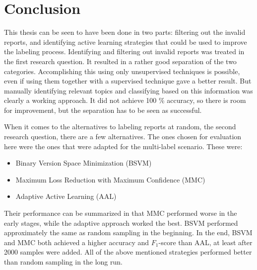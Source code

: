 
\chapter{Conclusion}
\label{cha:conclusion}

This thesis can be seen to have been done in two parts: filtering out the invalid reports, and identifying active learning strategies that could be used to improve the labeling process.
Identifying and filtering out invalid reports was treated in the first research question.
It resulted in a rather good separation of the two categories.
Accomplishing this using only unsupervised techniques is possible, even if using them together with a supervised technique gave a better result.
But manually identifying relevant topics and classifying based on this information was clearly a working approach.
It did not achieve 100 \% accuracy, so there is room for improvement, but the separation has to be seen as successful.

When it comes to the alternatives to labeling reports at random, the second research question, there are a few alternatives.
The ones chosen for evaluation here were the ones that were adapted for the multi-label scenario.
These were: 
\begin{itemize}
    \item Binary Version Space Minimization (BSVM)
    \item Maximum Loss Reduction with Maximum Confidence (MMC)
    \item Adaptive Active Learning (AAL)
\end{itemize}
Their performance can be summarized in that MMC performed worse in the early stages, while the adaptive approach worked the best.
BSVM performed approximately the same as random sampling in the beginning.
In the end, BSVM and MMC both achieved a higher accuracy and $F_1$-score than AAL, at least after 2000 samples were added.
All of the above mentioned strategies performed better than random sampling in the long run.

